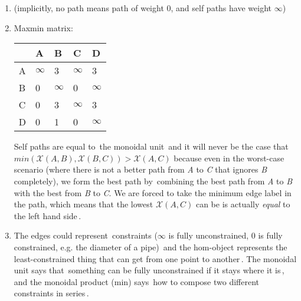 \begin{enumerate}
    \item  {} (implicitly, no path means path of weight 0, and self paths have weight $\infty$)
    \item Maxmin matrix:

          \begin{minipage}{0.48\textwidth}
            \begin{tabular}{|l|l|l|l|l|}
              \hline
                & A        & B        & C        & D        \\ \hline
              A & $\infty$ & 3        & $\infty$ & 3        \\ \hline
              B & 0        & $\infty$ & 0        & $\infty$ \\ \hline
              C & 0        & 3        & $\infty$ & 3        \\  \hline
              D & 0        & 1        & 0        & $\infty$ \\ \hline
            \end{tabular}
          \end{minipage}

          Self paths are equal to \,the monoidal unit\, and it will never be the case that $min(\mathcal{X}(A,B),\mathcal{X}(B,C)) >  \mathcal{X}(A,C)$ because even in the worst-case scenario (where there is not a better path from \emph{A} to \emph{C} that ignores \emph{B} completely), we form the best path by \,combining the best path from \emph{A} to \emph{B} with the best from \emph{B} to \emph{C}. We are forced to take the minimum edge label in the path, which means that the lowest $\mathcal{X}(A,C)$ can be is actually \emph{equal} to the left hand side\,.
    \item The edges could represent \,constraints ($\infty$ is fully unconstrained, $0$ is fully constrained, e.g. the diameter of a pipe)\, and the hom-object represents the \,least-constrained thing that can get from one point to another\,. The monoidal unit says that \,something can be fully unconstrained if it stays where it is\,, and the monoidal product (min) says \,how to compose two different constraints in series\,.
  \end{enumerate}
